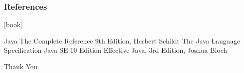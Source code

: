 \documentclass{beamer}
\begin{document}
\begin{frame}
\frametitle{References}
\begin{thebibliography}{2} %
[book]

 Java The Complete Reference 9th Edition, Herbert Schildt
 The Java Language Specification Java SE 10 Edition
 Effective Java, 3rd Edition, Joshua Bloch
\end{thebibliography}
\end{frame}


\begin{frame}
\Huge{\centerline{Thank You}}
\end{frame}


\end{document}
